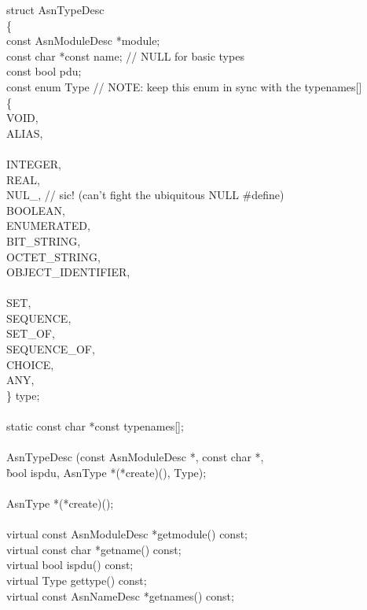 \begin{Ccode}
struct AsnTypeDesc\\
\{\+\\
  const AsnModuleDesc		\>\>*module;\\
  const char			\>\>*const name;	// NULL for basic types\\
  const bool			\>\>pdu;\\
  const enum Type \qquad // NOTE: keep this enum in sync with the typenames[]\\
  \{\+\\
    VOID,\\
    ALIAS,\\
\\
    INTEGER,\\
    REAL,\\
    NUL\_, // sic! (can't fight the ubiquitous NULL \#define)\\
    BOOLEAN,\\
    ENUMERATED,\\
    BIT\_STRING,\\
    OCTET\_STRING,\\
    OBJECT\_IDENTIFIER,\\
\\
    SET,\\
    SEQUENCE,\\
    SET\_OF,\\
    SEQUENCE\_OF,\\
    CHOICE,\\
    ANY,\-\\
  \}				\>\>type;\\
\\
  static const char		\>\>*const typenames[];\\
\\
				\>\>AsnTypeDesc (const AsnModuleDesc *, const char *,\\
					\`bool ispdu, AsnType *(*create)(), Type);\\
\\
  AsnType			\>\>*(*create)();\\
\\
  virtual const AsnModuleDesc	\>\>*getmodule() const;\\
  virtual const char		\>\>*getname() const;\\
  virtual bool			\>\>ispdu() const;\\
  virtual Type			\>\>gettype() const;\\
  virtual const AsnNameDesc	\>\>*getnames() const;\\

\end{Ccode}

